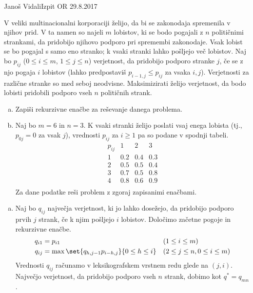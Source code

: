\begin{naloga}{Janoš Vidali}{Izpit OR 29.8.2017}
\begin{vprasanje}
V veliki multinacionalni korporaciji želijo,
da bi se zakonodaja spremenila v njihov prid.
V ta namen so najeli $m$ lobistov,
ki se bodo pogajali z $n$ političnimi strankami,
da pridobijo njihovo podporo pri spremembi zakonodaje.
Vsak lobist se bo pogajal s samo eno stranko;
k vsaki stranki lahko pošljejo več lobistov.
Naj bo $p_{ij}$ ($0 \le i \le m$, $1 \le j \le n$) verjetnost,
da pridobijo podporo stranke $j$,
če se z njo pogaja $i$ lobistov
(lahko predpostaviš $p_{i-1,j} \le p_{ij}$ za vsaka $i, j$).
Verjetnosti za različne stranke so med seboj neodvisne.
Maksimizirati želijo verjetnost,
da bodo lobisti pridobili podporo vseh $n$ političnih strank.

\begin{enumerate}[(a)]
\item Zapiši rekurzivne enačbe za reševanje danega problema.
\item Naj bo $m = 6$ in $n = 3$.
K vsaki stranki želijo poslati vsaj enega lobista
(tj., $p_{0j} = 0$ za vsak $j$),
vrednosti $p_{ij}$ za $i \ge 1$ pa so podane v spodnji tabeli.
$$
\begin{array}{c|ccc}
p_{ij} & 1 & 2 & 3 \\ \hline
1 & 0.2 & 0.4 & 0.3 \\
2 & 0.5 & 0.5 & 0.4 \\
3 & 0.7 & 0.5 & 0.8 \\
4 & 0.8 & 0.6 & 0.9 \\
\end{array}
$$
Za dane podatke reši problem z zgoraj zapisanimi enačbami.
\end{enumerate}
\end{vprasanje}

\begin{odgovor}
\begin{enumerate}[(a)]
\item Naj bo $q_{ij}$ največja verjetnost, ki jo lahko dosežejo,
da pridobijo podporo prvih $j$ strank,
če k njim pošljejo $i$ lobistov.
Določimo začetne pogoje in rekurzivne enačbe.
\begin{align*}
q_{i1} &= p_{i1} && (1 \le i \le m) \\
q_{ij} &= \max\set{q_{h,j-1} p_{i-h,j}}{0 \le h \le i}
&& (2 \le j \le n, 0 \le i \le m)
\end{align*}
Vrednosti $q_{ij}$ računamo v leksikografskem vrstnem redu glede na $(j, i)$.
Največjo verjetnost, da pridobijo podporo vseh $n$ strank,
dobimo kot $q^* = q_{mn}$.


\end{enumerate}
\end{odgovor}
\end{naloga}

